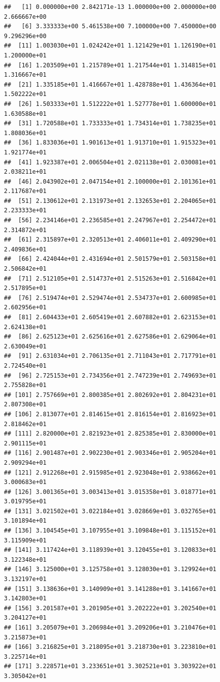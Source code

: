 \documentclass[]{book}
\theoremstyle{definition}
\theoremstyle{definition}
\theoremstyle{definition}
\theoremstyle{remark}
\begin{document}
\begin{verbatim}
##   [1] 0.000000e+00 2.842171e-13 1.000000e+00 2.000000e+00 2.666667e+00
##   [6] 3.333333e+00 5.461538e+00 7.100000e+00 7.450000e+00 9.296296e+00
##  [11] 1.003030e+01 1.024242e+01 1.121429e+01 1.126190e+01 1.200000e+01
##  [16] 1.203509e+01 1.215789e+01 1.217544e+01 1.314815e+01 1.316667e+01
##  [21] 1.335185e+01 1.416667e+01 1.428788e+01 1.436364e+01 1.502222e+01
##  [26] 1.503333e+01 1.512222e+01 1.527778e+01 1.600000e+01 1.630588e+01
##  [31] 1.720588e+01 1.733333e+01 1.734314e+01 1.738235e+01 1.808036e+01
##  [36] 1.833036e+01 1.901613e+01 1.913710e+01 1.915323e+01 1.921774e+01
##  [41] 1.923387e+01 2.006504e+01 2.021138e+01 2.030081e+01 2.038211e+01
##  [46] 2.043902e+01 2.047154e+01 2.100000e+01 2.101361e+01 2.117687e+01
##  [51] 2.130612e+01 2.131973e+01 2.132653e+01 2.204065e+01 2.233333e+01
##  [56] 2.234146e+01 2.236585e+01 2.247967e+01 2.254472e+01 2.314872e+01
##  [61] 2.315897e+01 2.320513e+01 2.406011e+01 2.409290e+01 2.409836e+01
##  [66] 2.424044e+01 2.431694e+01 2.501579e+01 2.503158e+01 2.506842e+01
##  [71] 2.512105e+01 2.514737e+01 2.515263e+01 2.516842e+01 2.517895e+01
##  [76] 2.519474e+01 2.529474e+01 2.534737e+01 2.600985e+01 2.602956e+01
##  [81] 2.604433e+01 2.605419e+01 2.607882e+01 2.623153e+01 2.624138e+01
##  [86] 2.625123e+01 2.625616e+01 2.627586e+01 2.629064e+01 2.630049e+01
##  [91] 2.631034e+01 2.706135e+01 2.711043e+01 2.717791e+01 2.724540e+01
##  [96] 2.725153e+01 2.734356e+01 2.747239e+01 2.749693e+01 2.755828e+01
## [101] 2.757669e+01 2.800385e+01 2.802692e+01 2.804231e+01 2.807308e+01
## [106] 2.813077e+01 2.814615e+01 2.816154e+01 2.816923e+01 2.818462e+01
## [111] 2.820000e+01 2.821923e+01 2.825385e+01 2.830000e+01 2.901115e+01
## [116] 2.901487e+01 2.902230e+01 2.903346e+01 2.905204e+01 2.909294e+01
## [121] 2.912268e+01 2.915985e+01 2.923048e+01 2.938662e+01 3.000683e+01
## [126] 3.001365e+01 3.003413e+01 3.015358e+01 3.018771e+01 3.019795e+01
## [131] 3.021502e+01 3.022184e+01 3.028669e+01 3.032765e+01 3.101894e+01
## [136] 3.104545e+01 3.107955e+01 3.109848e+01 3.115152e+01 3.115909e+01
## [141] 3.117424e+01 3.118939e+01 3.120455e+01 3.120833e+01 3.122348e+01
## [146] 3.125000e+01 3.125758e+01 3.128030e+01 3.129924e+01 3.132197e+01
## [151] 3.138636e+01 3.140909e+01 3.141288e+01 3.141667e+01 3.142803e+01
## [156] 3.201587e+01 3.201905e+01 3.202222e+01 3.202540e+01 3.204127e+01
## [161] 3.205079e+01 3.206984e+01 3.209206e+01 3.210476e+01 3.215873e+01
## [166] 3.216825e+01 3.218095e+01 3.218730e+01 3.223810e+01 3.225714e+01
## [171] 3.228571e+01 3.233651e+01 3.302521e+01 3.303922e+01 3.305042e+01

\end{verbatim}
\end{document}
